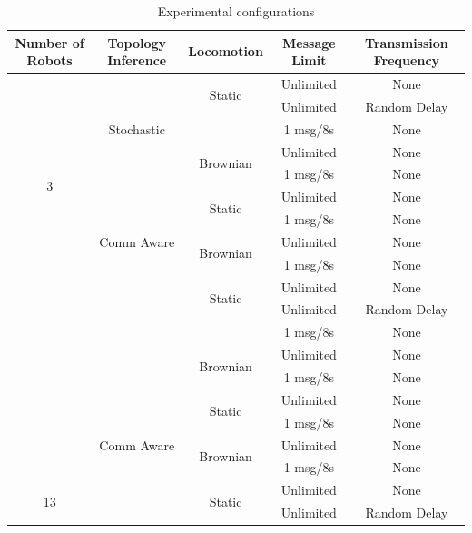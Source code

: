 \documentclass[conference]{IEEEtran}
\begin{document}
\begin{table}[ht]
\centering
\label{tab:exp_config}
\caption{Experimental configurations}
\begin{tabular}{c|c|c|c|c}
\toprule
\textbf{Number of Robots} & \textbf{Topology Inference} & \textbf{Locomotion} & \textbf{Message Limit} & \textbf{Transmission Frequency} \\
\midrule
\multirow{10}{*}{3}
  & \multirow{5}{*}{Stochastic}
    & \multirow{2}{*}{Static}
                 & Unlimited& None \\
  &   &          & Unlimited& Random Delay \\
  &   &          & 1 msg/8s & None \\
  \cmidrule{4-5}
  &   & \multirow{2}{*}{Brownian}
                 & Unlimited& None \\
  &   &          & 1 msg/8s & None \\
  \cmidrule{2-5}
  & \multirow{5}{*}{Comm Aware}
    & \multirow{2}{*}{Static}
                 & Unlimited& None \\
  &   &          & 1 msg/8s & None \\
  \cmidrule{4-5}
  &   & \multirow{2}{*}{Brownian}
                 & Unlimited& None \\
  &   &          & 1 msg/8s & None \\
\midrule
\multirow{10}{*}{8}
  & \multirow{5}{*}{Stochastic}
    & \multirow{2}{*}{Static}
                 & Unlimited& None \\
  &   &          & Unlimited& Random Delay \\
  &   &          & 1 msg/8s & None \\
  \cmidrule{4-5}
  &   & \multirow{2}{*}{Brownian}
                 & Unlimited& None \\
  &   &          & 1 msg/8s & None \\
  \cmidrule{2-5}
  & \multirow{5}{*}{Comm Aware}
    & \multirow{2}{*}{Static}
                 & Unlimited& None \\
  &   &          & 1 msg/8s & None \\
  \cmidrule{4-5}
  &   & \multirow{2}{*}{Brownian}
                 & Unlimited& None \\
  &   &          & 1 msg/8s & None \\
\midrule
\multirow{10}{*}{13}
  & \multirow{5}{*}{Stochastic}
    & \multirow{2}{*}{Static}
                 & Unlimited& None \\
  &   &          & Unlimited& Random Delay \\

\end{tabular}
\end{table}
\end{document}
